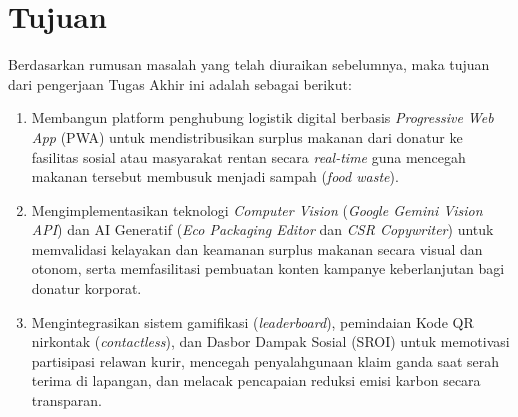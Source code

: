 \section{Tujuan}
Berdasarkan rumusan masalah yang telah diuraikan sebelumnya, maka tujuan dari pengerjaan Tugas Akhir ini adalah sebagai berikut:
\begin{enumerate}
    \item Membangun platform penghubung logistik digital berbasis \textit{Progressive Web App} (PWA) untuk mendistribusikan surplus makanan dari donatur ke fasilitas sosial atau masyarakat rentan secara \textit{real-time} guna mencegah makanan tersebut membusuk menjadi sampah (\textit{food waste}).
    \item Mengimplementasikan teknologi \textit{Computer Vision} (\textit{Google Gemini Vision API}) dan AI Generatif (\textit{Eco Packaging Editor} dan \textit{CSR Copywriter}) untuk memvalidasi kelayakan dan keamanan surplus makanan secara visual dan otonom, serta memfasilitasi pembuatan konten kampanye keberlanjutan bagi donatur korporat.
    \item Mengintegrasikan sistem gamifikasi (\textit{leaderboard}), pemindaian Kode QR nirkontak (\textit{contactless}), dan Dasbor Dampak Sosial (SROI) untuk memotivasi partisipasi relawan kurir, mencegah penyalahgunaan klaim ganda saat serah terima di lapangan, dan melacak pencapaian reduksi emisi karbon secara transparan.
\end{enumerate}

